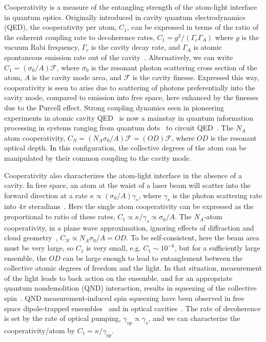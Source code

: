 \documentclass[aps,pra,twocolumn,superscriptaddress]{revtex4-1} %
\begin{document}
Cooperativity is a measure of the entangling strength of the atom-light interface in quantum optics.  Originally introduced in cavity quantum electrodynamics (QED), the cooperativity per atom, $C_1$, can be expressed in terms of the ratio of the coherent coupling rate to decoherence rates, $C_1 = g^2/(\Gamma_c \Gamma_A)$ where $g$ is the vacuum Rabi frequency,  $\Gamma_c$ is the cavity decay rate, and $\Gamma_A$ is atomic spontaneous emission rate out of the cavity~\cite{Kimble1998}.  Alternatively, we can write $C_1 = (\sigma_0/A) \mathcal{F}$, where $\sigma_0$ is the resonant photon scattering cross section of the atom, $A$ is the cavity mode area, and $\mathcal{F}$ is the cavity finesse.  Expressed this way, cooperativity is seen to arise due to scattering of photons preferentially into the cavity mode, compared to emission into free space, here enhanced by the finesses due to the Purcell effect. Strong coupling dynamics seen in pioneering experiments in atomic cavity QED~\cite{Raimond2001Manipulating, Miller2005} is now a mainstay in quantum information processing in systems ranging from quantum dots~\cite{Akimov2007, Akopian2006, Liu2010} to circuit QED~\cite{Wallraff2004Strong, Hofheinz2009Synthesizing}.  The $N_A$ atom cooperativity, $C_N = (N_A \sigma_0/A) \mathcal{F} =( OD) \mathcal{F}$, where $OD$ is the resonant optical depth.  In this configuration, the collective degrees of the atom can be manipulated by their common coupling to the cavity mode.

Cooperativity also characterizes the atom-light interface in the absence of a cavity.  In free space, an atom at the waist of a laser beam will scatter into the forward direction at a rate $\kappa \propto (\sigma_0/A) \gamma_s$, where $\gamma_s$ is the photon scattering rate into $4 \pi$ steradians~\cite{Baragiola2014}.  Here the single atom cooperativity can be expressed as the proportional to ratio of these rates, $C_1 \propto \kappa/\gamma_s \propto \sigma_0/A$.  The $N_A$-atom cooperativity, in a plane wave approximation, ignoring effects of diffraction and cloud geometry~\cite{Baragiola2014}, $C_N \propto N_A \sigma_0/A = OD$.  To be self-consistent, here the beam area must be very large, so $C_1$ is very small, e.g. $C_1 \sim 10^{-6}$, but for a sufficiently large ensemble, the $OD$ can be large enough to lead to entanglement between the collective atomic degrees of freedom and the light.  In that situation, measurement of the light leads to back action on the ensemble, and for an appropriate quantum nondemolition (QND) interaction, results in squeezing of the collective spin~\cite{Kuzmich1998, Takahashi1999Quantum}. QND measurement-induced spin squeezing have been observed in free space dipole-trapped ensembles~\cite{Appel2009Mesoscopic, Takano2009Spin, Sewell2012Magnetic} and in optical cavities~\cite{Schleier-Smith2010States, Cox2016Deterministic, Hosten2016}. The rate of decoherence is set by the rate of optical pumping,  $\gamma_{op} \propto \gamma_s$, and we can characterize the cooperativity/atom by $C_1 = \kappa/\gamma_{op}$.
\end{document}
